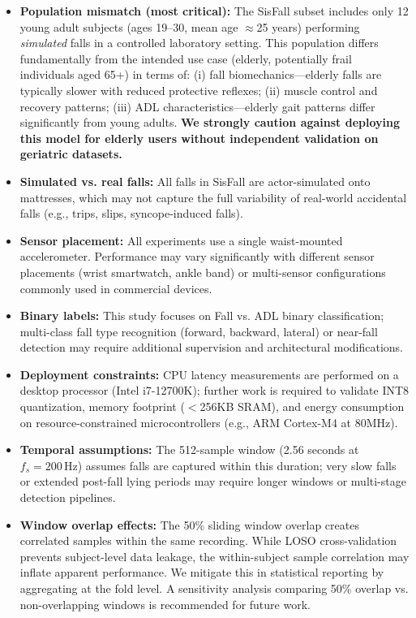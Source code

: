 \documentclass{article}
\begin{document}
\begin{itemize}
    \item \textbf{Population mismatch (most critical):} The SisFall subset includes only 12 young adult subjects (ages 19--30, mean age $\approx$25 years) performing \textit{simulated} falls in a controlled laboratory setting. This population differs fundamentally from the intended use case (elderly, potentially frail individuals aged 65+) in terms of: (i) fall biomechanics---elderly falls are typically slower with reduced protective reflexes; (ii) muscle control and recovery patterns; (iii) ADL characteristics---elderly gait patterns differ significantly from young adults. \textbf{We strongly caution against deploying this model for elderly users without independent validation on geriatric datasets.}
    \item \textbf{Simulated vs. real falls:} All falls in SisFall are actor-simulated onto mattresses, which may not capture the full variability of real-world accidental falls (e.g., trips, slips, syncope-induced falls).
    \item \textbf{Sensor placement:} All experiments use a single waist-mounted accelerometer. Performance may vary significantly with different sensor placements (wrist smartwatch, ankle band) or multi-sensor configurations commonly used in commercial devices.
    \item \textbf{Binary labels:} This study focuses on Fall vs. ADL binary classification; multi-class fall type recognition (forward, backward, lateral) or near-fall detection may require additional supervision and architectural modifications.
    \item \textbf{Deployment constraints:} CPU latency measurements are performed on a desktop processor (Intel i7-12700K); further work is required to validate INT8 quantization, memory footprint ($<$256KB SRAM), and energy consumption on resource-constrained microcontrollers (e.g., ARM Cortex-M4 at 80MHz).
    \item \textbf{Temporal assumptions:} The 512-sample window (2.56 seconds at $f_s=200\,\mathrm{Hz}$) assumes falls are captured within this duration; very slow falls or extended post-fall lying periods may require longer windows or multi-stage detection pipelines.
    \item \textbf{Window overlap effects:} The 50\% sliding window overlap creates correlated samples within the same recording. While LOSO cross-validation prevents subject-level data leakage, the within-subject sample correlation may inflate apparent performance. We mitigate this in statistical reporting by aggregating at the fold level. A sensitivity analysis comparing 50\% overlap vs. non-overlapping windows is recommended for future work.
\end{itemize}
\end{document}
